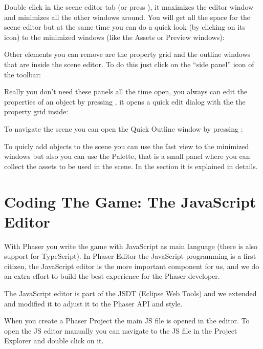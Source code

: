 \documentclass[letterpaper,10pt,english]{sphinxmanual}
\begin{document}
Double click in the scene editor tab (or press ), it maximizes the editor window and minimizes all the other windows around. You will get all the space for the scene editor but at the same time you can do a quick look (by clicking on its icon) to the minimized windows (like the Assets or Preview windows):

\noindent{}

Other elements you can remove are the property grid and the outline windows that are inside the scene editor. To do this just click on the “side panel” icon of the toolbar:

\noindent{}

Really you don’t need these panels all the time open, you always can edit the properties of an object by pressing , it opens a quick edit dialog with the the property grid inside:

\noindent{}

To navigate the scene you can open the Quick Outline window by pressing :

\noindent{}

To quicly add objects to the scene you can use the fast view to the minimized windows but also you can use the Palette, that is a small panel where you can collect the assets to be used in the scene. In the section {\hyperref[\detokenize{canvas:from-the-palette}]{}} it is explained in details.


\chapter{Coding The Game: The JavaScript Editor}
\label{\detokenize{jseditor:coding-the-game-the-javascript-editor}}\label{\detokenize{jseditor::doc}}
With Phaser you write the game with JavaScript as main language (there is also support for TypeScript). In Phaser Editor the JavaScript programming is a first citizen, the JavaScript editor is the more important component for us, and we do an extra effort to build the best experience for the Phaser developer.

The JavaScript editor is part of the JSDT (Eclipse Web Tools) and we extended and modified it to adjust it to the Phaser API and style.

When you create a Phaser Project the main JS file is opened in the editor. To open the JS editor manually you can navigate to the JS file in the Project Explorer and double click on it.
\end{document}
